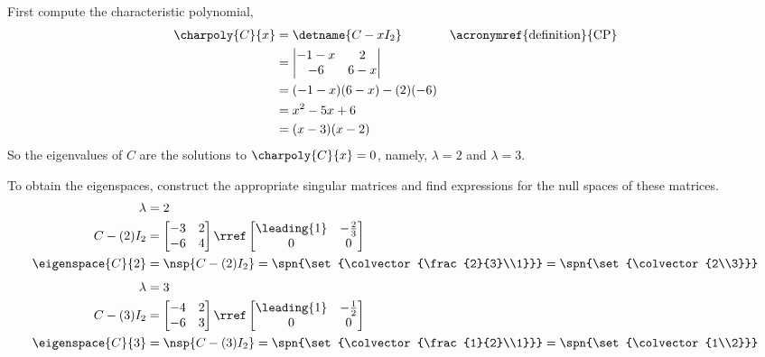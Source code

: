 First compute the characteristic polynomial,
%
\begin{align*}
\charpoly{C}{x}
&=\detname{C-xI_2}&&\text{\acronymref{definition}{CP}}\\
%
&=
\begin{vmatrix}
 -1-x & 2 \\
 -6    & 6-x
\end{vmatrix}\\
%
&=(-1-x)(6-x)-(2)(-6)\\
&=x^2-5x+6\\
&=(x-3)(x-2)
%
\end{align*}
%
So the eigenvalues of $C$ are the solutions to $\charpoly{C}{x}=0$, namely, $\lambda=2$ and $\lambda=3$.\par
%
To obtain the eigenspaces, construct the appropriate singular matrices and find expressions for the null spaces of these matrices.
\begin{align*}
%
\lambda&=2\\
C-(2)I_2&=
\begin{bmatrix}
-3 & 2\\
-6 & 4
\end{bmatrix}
\rref
\begin{bmatrix}
\leading{1} & -\frac{2}{3}\\
0 & 0
\end{bmatrix}\\
\eigenspace{C}{2}&=\nsp{C-(2)I_2}=
\spn{\set{\colvector{\frac{2}{3}\\1}}}
=
\spn{\set{\colvector{2\\3}}}
%
\end{align*}
%
\begin{align*}
%
\lambda&=3\\
C-(3)I_2&=
\begin{bmatrix}
-4 & 2\\
-6 & 3
\end{bmatrix}
\rref
\begin{bmatrix}
\leading{1} & -\frac{1}{2}\\
0 & 0
\end{bmatrix}\\
\eigenspace{C}{3}&=\nsp{C-(3)I_2}=
\spn{\set{\colvector{\frac{1}{2}\\1}}}
=
\spn{\set{\colvector{1\\2}}}
%
\end{align*}
